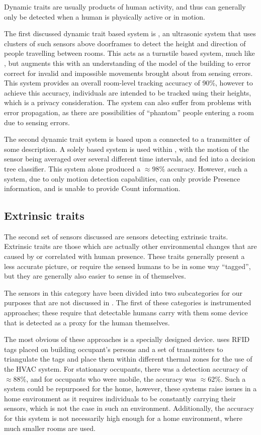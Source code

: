 \documentclass[../thesis/thesis.tex]{subfiles}
\begin{document}
Dynamic traits are usually products of human activity, and thus can generally only be detected when a human is physically active or in motion.

The first discussed dynamic trait based system is \cite{hnat2012doorjamb}, an ultrasonic system that uses clusters of such sensors above doorframes to detect the height and direction of people travelling between rooms. This acts as a turnstile based system, much like \cite{erickson2013poem}, but augments this with an understanding of the model of the building to error correct for invalid and impossible movements brought about from sensing errors. This system provides an overall room-level tracking accuracy of 90\%, however to achieve this accuracy, individuals are intended to be tracked using their heights, which is a privacy consideration. The system can also suffer from problems with error propagation, as there are possibilities of ``phantom'' people entering a room due to sensing errors.

The second dynamic trait system is based upon a \pir connected to a transmitter of some description. A solely \pir based system is used within \cite{hailemariam2011real}, with the motion of the sensor being averaged over several different time intervals, and fed into a decision tree classifier. This \pir system alone produced a $\approx98\%$ accuracy. However, such a system, due to only motion detection capabilities, can only provide Presence information, and is unable to provide Count information.

\subsection{Extrinsic traits}
\label{subsec:litreview:sensors:extrinsic}
The second set of sensors discussed are sensors detecting extrinsic traits. Extrinsic traits are those which are actually other environmental changes that are caused by or correlated with human presence. These traits generally present a less accurate picture, or require the sensed humans to be in some way ``tagged'', but they are generally also easier to sense in of themselves.

The sensors in this category have been divided into two subcategories for our purposes that are not discussed in \cite{teixeira2010survey}. The first of these categories is instrumented approaches; these require that detectable humans carry with them some device that is detected as a proxy for the human themselves.

The most obvious of these approaches is a specially designed device. \cite{li2012measuring} uses RFID tags placed on building occupant's persons and a set of transmitters to triangulate the tags and place them within different thermal zones for the use of the HVAC system. For stationary occupants, there was a detection accuracy of $\approx88\%$, and for occupants who were mobile, the accuracy was $\approx62\%$. Such a system could be repurposed for the home, however, these systems raise issues in a home environment as it requires individuals to be constantly carrying their sensors, which is not the case in such an environment. Additionally, the accuracy for this system is not necessarily high enough for a home environment, where much smaller rooms are used.
\end{document}
